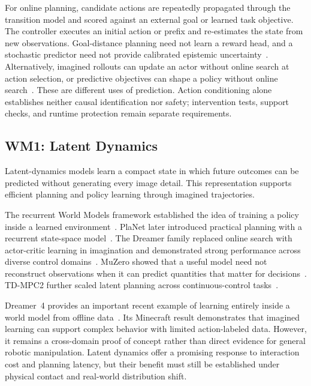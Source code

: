 \documentclass{ieeeaccess}
\begin{document}
\textcolor[RGB]{104,48,148}{For online planning, candidate actions are repeatedly propagated through the transition model and scored against an external goal or learned task objective. The controller executes an initial action or prefix and re-estimates the state from new observations. Goal-distance planning need not learn a reward head, and a stochastic predictor need not provide calibrated epistemic uncertainty~\cite{vjepa2}. Alternatively, imagined rollouts can update an actor without online search at action selection, or predictive objectives can shape a policy without online search~\cite{dreamerv3,flarewm}. These are different uses of prediction. Action conditioning alone establishes neither causal identification nor safety; intervention tests, support checks, and runtime protection remain separate requirements.}

\subsection{WM1: Latent Dynamics}
\label{sec:wm1}

Latent-dynamics models learn a compact state in which future outcomes can be predicted without generating every image detail. This representation supports efficient planning and policy learning through imagined trajectories.

The recurrent World Models framework established the idea of training a policy inside a learned environment~\cite{worldmodels2018}. PlaNet later introduced practical planning with a recurrent state-space model~\cite{planet}. The Dreamer family replaced online search with actor-critic learning in imagination and demonstrated strong performance across diverse control domains~\cite{dreamerv3}. MuZero showed that a useful model need not reconstruct observations when it can predict quantities that matter for decisions~\cite{muzero}. TD-MPC2 further scaled latent planning across continuous-control tasks~\cite{tdmpc2}.

Dreamer~4 provides an important recent example of learning entirely inside a world model from offline data~\cite{dreamer4}. Its Minecraft result demonstrates that imagined learning can support complex behavior with limited action-labeled data. However, it remains a cross-domain proof of concept rather than direct evidence for general robotic manipulation. Latent dynamics offer a promising response to interaction cost and planning latency, but their benefit must still be established under physical contact and real-world distribution shift.
\end{document}
